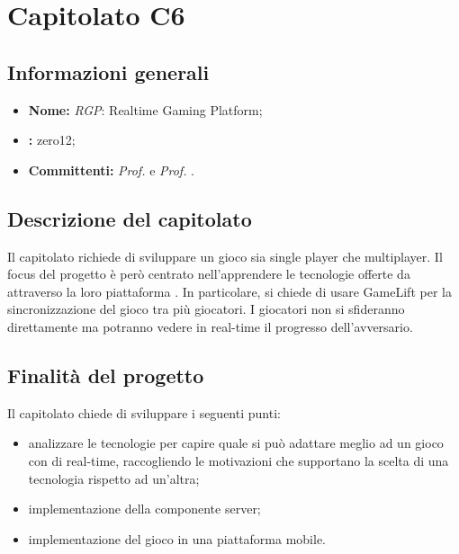 \section{Capitolato C6}

\subsection{Informazioni generali}
\begin{itemize}
\item \textbf{Nome:} \textit{RGP}: Realtime Gaming Platform;
\item \textbf{:} zero12;
\item \textbf{Committenti:} \textit{Prof. \Tullio{}} e \textit{Prof. \Riccardo{}}.
\end{itemize}

\subsection{Descrizione del capitolato}
Il capitolato richiede di sviluppare un gioco sia single player che multiplayer.
Il focus del progetto è però centrato nell'apprendere le tecnologie offerte da  attraverso la loro piattaforma .
In particolare, si chiede di usare  GameLift per la sincronizzazione del gioco tra più giocatori.
I giocatori non si sfideranno direttamente ma potranno vedere in real-time il progresso dell'avversario.

\subsection{Finalità del progetto}
Il capitolato chiede di sviluppare i seguenti punti:
\begin{itemize}
\item analizzare le tecnologie  per capire quale si può adattare meglio ad un gioco con  di real-time, raccogliendo le motivazioni che supportano la scelta di una tecnologia rispetto ad un'altra;
\item implementazione della componente server;
\item implementazione del gioco in una piattaforma mobile.
\end{itemize}

